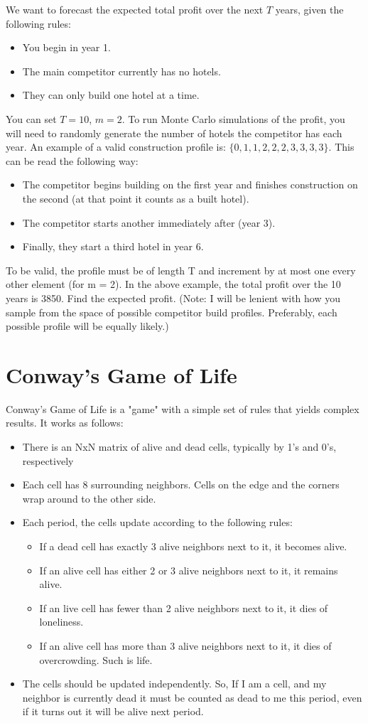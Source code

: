 \documentclass[12pt]{article}
\begin{document}
We want to forecast the expected total profit over the next $T$ years, given the following rules:
\begin{itemize}
	\item You begin in year 1.
	\item The main competitor currently has no hotels.
	\item They can only build one hotel at a time.
\end{itemize}
You can set $T = 10$, $m = 2$. To run Monte Carlo simulations of the profit, you will need to randomly generate the number of hotels the competitor has each year. An example of a valid construction profile is: $\{0,1,1,2,2,2,3,3,3,3\}$. This can be read the following way:
\begin{itemize}
	\item The competitor begins building on the first year and finishes construction on the second (at that point it counts as a built hotel).
	\item The competitor starts another immediately after (year 3).
	\item Finally, they start a third hotel in year 6.
\end{itemize}
To be valid, the profile must be of length T and increment by at most one every other element (for m = 2). In the above example, the total profit over the 10 years is 3850. Find the expected profit. (Note: I will be lenient with how you sample from the space of possible competitor build profiles. Preferably, each possible profile will be equally likely.)

\section{Conway's Game of Life}
Conway's Game of Life is a "game" with a simple set of rules that yields complex results. It works as follows:
\begin{itemize}
	\item There is an NxN matrix of alive and dead cells, typically by 1's and 0's, respectively
	\item Each cell has 8 surrounding neighbors. Cells on the edge and the corners wrap around to the other side.
	\item Each period, the cells update according to the following rules:
	\begin{itemize}
		\item If a dead cell has exactly 3 alive neighbors next to it, it becomes alive.
		\item If an alive cell has either 2 or 3 alive neighbors next to it, it remains alive.
		\item If an live cell has fewer than 2 alive neighbors next to it, it dies of loneliness.
		\item If an alive cell has more than 3 alive neighbors next to it, it dies of overcrowding. Such is life.
	\end{itemize}
	\item The cells should be updated independently. So, If I am a cell, and my neighbor is currently dead it must be counted as dead to me this period, even if it turns out it will be alive next period.
\end{itemize}
\end{document}
